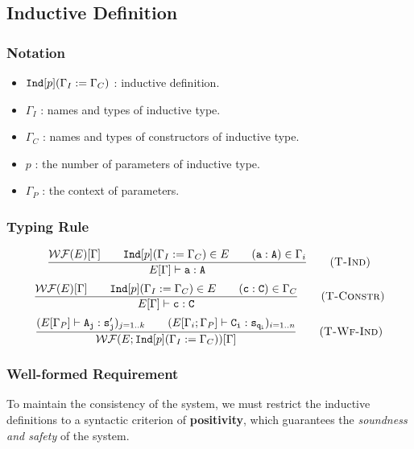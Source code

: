 \subsection{Inductive Definition}

\subsubsection{Notation}
\begin{itemize}
    \item ${\tt Ind}[p](\Gamma_I:=\Gamma_C)$ : inductive definition.
    \item $\Gamma_I$ : names and types of inductive type.
    \item $\Gamma_C$ : names and types of constructors of inductive type.
    \item $p$ : the number of parameters of inductive type.
    \item $\Gamma_P$ : the context of parameters.
\end{itemize}

\subsubsection{Typing Rule}
\begin{equation*}
\frac{\mathcal{WF}(E)[\Gamma]\qquad {\tt Ind}[p](\Gamma_I:=\Gamma_C)\in E\qquad {\tt(a:A)}\in\Gamma_i}
    {E[\Gamma]\vdash\tt a:A}
    \tag{\sc T-Ind}
\end{equation*}
\begin{equation*}
\frac{\mathcal{WF}(E)[\Gamma]\qquad {\tt Ind}[p](\Gamma_I:=\Gamma_C)\in E\qquad {\tt (c:C)}\in\Gamma_C}
    {E[\Gamma]\vdash\tt c:C}
    \tag{\sc T-Constr}
\end{equation*}
\begin{equation*}
\frac{(E[\Gamma_P]\vdash{\tt A_j:s_j'})_{j=1..k}\qquad (E[\Gamma_i;\Gamma_P]\vdash{\tt C_i:s_{q_i}})_{i=1..n}}
    {\mathcal{WF}(E;{\tt Ind}[p](\Gamma_I:=\Gamma_C))[\Gamma]}
    \tag{\sc T-Wf-Ind}
\end{equation*}

\subsubsection{Well-formed Requirement}

To maintain the consistency of the system, we must restrict the inductive definitions to a syntactic criterion of 
\textbf{positivity}, which guarantees the \textit{soundness and safety} of the system.

